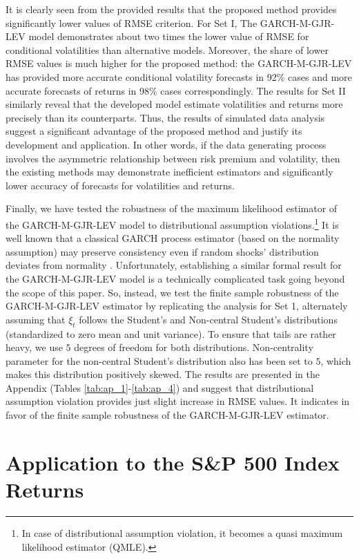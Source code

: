 \documentclass[authoryear, 1p]{elsarticle}
\numberwithin{equation}{section}
\begin{document}
It is clearly seen from the provided results that the proposed method provides significantly lower values of RMSE criterion. For Set I, The GARCH-M-GJR-LEV model demonstrates about two times the lower value of RMSE for conditional volatilities than alternative models. Moreover, the share of lower RMSE values is much higher for the proposed method: the GARCH-M-GJR-LEV has provided more accurate conditional volatility forecasts in 92\% cases and more accurate forecasts of returns in 98\% cases correspondingly. The results for Set II similarly reveal that the developed model estimate volatilities and returns more precisely than its counterparts. Thus, the results of simulated data analysis suggest a significant advantage of the proposed method and justify its development and application. In other words, if the data generating process involves the asymmetric relationship between risk premium and volatility, then the existing methods may demonstrate inefficient estimators and significantly lower accuracy of forecasts for volatilities and returns.

Finally, we have tested the robustness of the maximum likelihood estimator of the GARCH-M-GJR-LEV model to distributional assumption violations.\footnote{In case of distributional assumption violation, it becomes a quasi maximum likelihood estimator (QMLE).} It is well known that a classical GARCH process estimator (based on the normality assumption) may preserve consistency even if random shocks' distribution deviates from normality \citep{Berkes2004}. Unfortunately, establishing a similar formal result for the GARCH-M-GJR-LEV model is a technically complicated task going beyond the scope of this paper. So, instead, we test the finite sample robustness of the GARCH-M-GJR-LEV estimator by replicating the analysis for Set 1, alternately assuming that $\xi_{t}$ follows the Student's and Non-central Student's distributions (standardized to zero mean and unit variance). To ensure that tails are rather heavy, we use $5$ degrees of freedom for both distributions. Non-centrality parameter for the non-central Student's distribution also has been set to $5$, which makes this distribution positively skewed. The results are presented in the Appendix (Tables \ref{tab:ap_1}-\ref{tab:ap_4}) and suggest that distributional assumption violation provides just slight increase in RMSE values. It indicates in favor of the finite sample robustness of the GARCH-M-GJR-LEV estimator.

\section{Application to the S\&P 500 Index Returns} \label{Section6}
\end{document}
